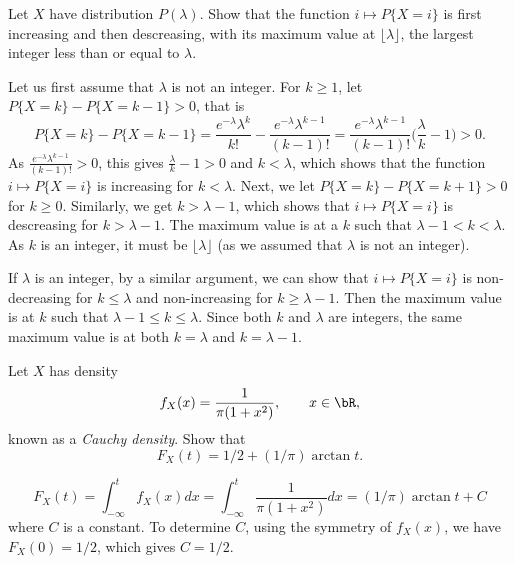 \begin{exercise}
  Let $X$ have distribution $P(\lambda)$. Show that the function $i\mapsto P\{X=i\}$ is first increasing and then descreasing, with its maximum value at $\lfloor\lambda\rfloor$, the largest integer less than or equal to $\lambda$.
\end{exercise}
\begin{solution}
  Let us first assume that $\lambda$ is not an integer. For $k\geq 1$, let $P\{X=k\} - P\{X=k-1\} > 0$, that is
  \[ P\{X=k\} - P\{X=k-1\} = \frac{e^{-\lambda}\lambda^{k}}{k!} - \frac{e^{-\lambda}\lambda^{k-1}}{(k-1)!} = \frac{e^{-\lambda}\lambda^{k-1}}{(k-1)!}\big(\frac{\lambda}{k} -1\big) > 0 .\]
  As $\frac{e^{-\lambda}\lambda^{k-1}}{(k-1)!}>0$, this gives $\frac{\lambda}{k}-1> 0$ and $k<\lambda$, which shows that the function $i\mapsto P\{X=i\}$ is increasing for $k<\lambda$. Next, we let $P\{X=k\} - P\{X=k+1\} > 0$ for $k\geq 0$. Similarly, we get $k > \lambda - 1$, which shows that $i\mapsto P\{X=i\}$ is descreasing for $k>\lambda - 1$. The maximum value is at a $k$ such that $\lambda-1<k<\lambda$. As $k$ is an integer, it must be $\lfloor\lambda\rfloor$ (as we assumed that $\lambda$ is not an integer).

  If $\lambda$ is an integer, by a similar argument, we can show that $i\mapsto P\{X=i\}$ is non-decreasing for $k\leq\lambda$ and non-increasing for $k\geq\lambda-1$. Then the maximum value is at $k$ such that $\lambda-1\leq k\leq \lambda$. Since both $k$ and $\lambda$ are integers, the same maximum value is at both $k=\lambda$ and $k=\lambda -1$.
\end{solution}


\begin{exercise}
  Let $X$ has density
  \[ f_X(x) = \frac{1}{\pi(1+x^2)},\qquad x\in\bR, \]
  known as a \textit{Cauchy density}. Show that
  \[ F_X(t) = 1/2 + (1/\pi)\arctan t. \]
\end{exercise}
\begin{solution}
  \[ F_X(t) = \int_{-\infty}^t f_X(x)dx = \int_{-\infty}^t\frac{1}{\pi(1+x^2)}dx = (1/\pi)\arctan t + C \]
  where $C$ is a constant. To determine $C$, using the symmetry of $f_X(x)$, we have $F_X(0)=1/2$, which gives $C=1/2$.
\end{solution}
